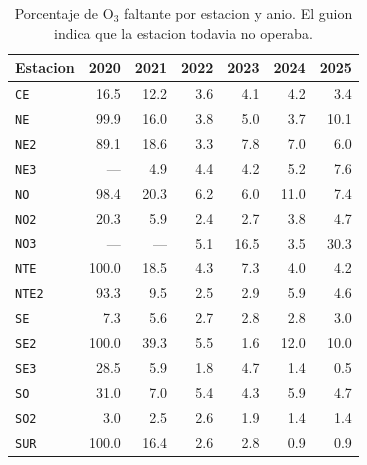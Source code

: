 \begin{table}[pos=t]
  \centering
  \caption{Porcentaje de O$_3$ faltante por estacion y anio. El guion indica
    que la estacion todavia no operaba.}
  \label{tab:dic-o3-faltante}
  \small
  \begin{tabular}{lrrrrrr}
    \toprule
    Estacion & 2020 & 2021 & 2022 & 2023 & 2024 & 2025 \\
    \midrule
    \texttt{CE}   & 16.5  & 12.2 & 3.6 & 4.1  & 4.2  & 3.4  \\
    \texttt{NE}   & 99.9  & 16.0 & 3.8 & 5.0  & 3.7  & 10.1 \\
    \texttt{NE2}  & 89.1  & 18.6 & 3.3 & 7.8  & 7.0  & 6.0  \\
    \texttt{NE3}  & ---   & 4.9  & 4.4 & 4.2  & 5.2  & 7.6  \\
    \texttt{NO}   & 98.4  & 20.3 & 6.2 & 6.0  & 11.0 & 7.4  \\
    \texttt{NO2}  & 20.3  & 5.9  & 2.4 & 2.7  & 3.8  & 4.7  \\
    \texttt{NO3}  & ---   & ---  & 5.1 & 16.5 & 3.5  & 30.3 \\
    \texttt{NTE}  & 100.0 & 18.5 & 4.3 & 7.3  & 4.0  & 4.2  \\
    \texttt{NTE2} & 93.3  & 9.5  & 2.5 & 2.9  & 5.9  & 4.6  \\
    \texttt{SE}   & 7.3   & 5.6  & 2.7 & 2.8  & 2.8  & 3.0  \\
    \texttt{SE2}  & 100.0 & 39.3 & 5.5 & 1.6  & 12.0 & 10.0 \\
    \texttt{SE3}  & 28.5  & 5.9  & 1.8 & 4.7  & 1.4  & 0.5  \\
    \texttt{SO}   & 31.0  & 7.0  & 5.4 & 4.3  & 5.9  & 4.7  \\
    \texttt{SO2}  & 3.0   & 2.5  & 2.6 & 1.9  & 1.4  & 1.4  \\
    \texttt{SUR}  & 100.0 & 16.4 & 2.6 & 2.8  & 0.9  & 0.9  \\
    \bottomrule
  \end{tabular}
\end{table}

